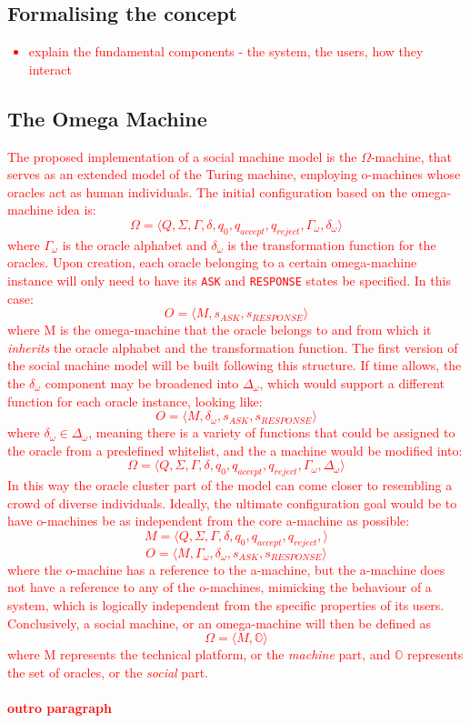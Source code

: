 \documentclass[12pt,a4,xcolor=table]{article}
\begin{document}
	\subsection{Formalising the concept}
	\textcolor{red}{
		\begin{itemize}
			\item explain the fundamental components - the system, the users, how they interact
		\end{itemize}
	}
	\subsection{The Omega Machine}\label{sec:omega}
	\textcolor{red}{
	The proposed implementation of a social machine model is the $\Omega$-machine, that serves as an extended model of the Turing machine, employing o-machines whose oracles act as human individuals\cite{Zhang2014}. The initial configuration based on the omega-machine idea is:
	\[\Omega = \langle Q, \Sigma, \Gamma, \delta, q_{0}, q_{accept}, q_{reject},\Gamma_{\omega} ,\delta_{\omega}\rangle\] 
	where $\Gamma_{\omega}$ is the oracle alphabet and $\delta_{\omega}$ is the transformation function for the oracles. Upon creation, each oracle belonging to a certain omega-machine instance will only need to have its \texttt{ASK} and \texttt{RESPONSE} states be specified. In this case: 
	\[O = \langle M, s_{ASK}, s_{RESPONSE} \rangle\] 
	where M is the omega-machine that the oracle belongs to and from which it \textit{inherits} the oracle alphabet and the transformation function. The first version of the social machine model will be built following this structure.
	If time allows, the the $\delta_{\omega}$ component may be broadened into $\Delta_{\omega}$, which would support a different function for each oracle instance, looking like: 
	\[O = \langle M, \delta_{\omega}, s_{ASK}, s_{RESPONSE} \rangle\] 
	where $\delta_{\omega} \in \Delta_{\omega}$, meaning there is a variety of functions that could be assigned to the oracle from a predefined whitelist, and the a machine would be modified into:
	 \[\Omega = \langle Q, \Sigma, \Gamma, \delta, q_{0}, q_{accept}, q_{reject},\Gamma_{\omega} ,\Delta_{\omega}\rangle\]
	In this way the oracle cluster part of the model can come closer to resembling a crowd of diverse individuals.
	Ideally, the ultimate configuration goal would be to have o-machines be as independent from the core a-machine as possible:
	\[M = \langle Q, \Sigma, \Gamma, \delta, q_{0}, q_{accept}, q_{reject},\rangle\]
	\[O = \langle M, \Gamma_{\omega}, \delta_{\omega}, s_{ASK}, s_{RESPONSE} \rangle\]
	where the o-machine has a reference to the a-machine, but the a-machine does not have a reference to any of the o-machines, mimicking the behaviour of a system, which is logically independent from the specific properties of its users. Conclusively, a social machine, or an omega-machine will then be defined as \[\Omega = \langle M, \mathbb{O} \rangle \] where M represents the technical platform, or the \textit{machine} part, and $\mathbb{O}$ represents the set of oracles, or the \textit{social} part.
	\paragraph{outro paragraph}
	}
\end{document}
